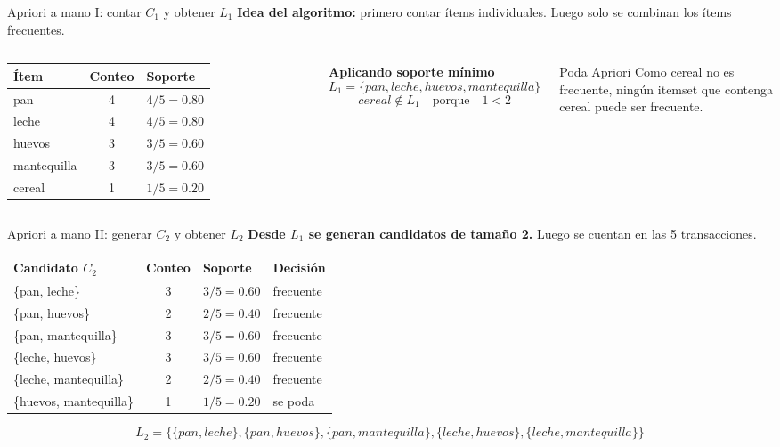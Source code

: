 \documentclass[10pt,aspectratio=169]{beamer}
\begin{document}
\begin{frame}{Apriori a mano I: contar $C_1$ y obtener $L_1$}
\scriptsize
\textbf{Idea del algoritmo:} primero contar ítems individuales. Luego solo se combinan los ítems frecuentes.

\vspace{0.15cm}
\begin{columns}[T]
\begin{table}
\centering
\begin{tabular}{lcl}
\toprule
Ítem & Conteo & Soporte \\
\midrule
pan & 4 & $4/5=0.80$ \\
leche & 4 & $4/5=0.80$ \\
huevos & 3 & $3/5=0.60$ \\
mantequilla & 3 & $3/5=0.60$ \\
cereal & 1 & $1/5=0.20$ \\
\bottomrule
\end{tabular}
\end{table}

\textbf{Aplicando soporte mínimo}
\[
L_1=\{pan, leche, huevos, mantequilla\}
\]
\[
cereal \notin L_1 \quad \text{porque} \quad 1 < 2
\]
\begin{alertblock}{Poda Apriori}
Como cereal no es frecuente, ningún itemset que contenga cereal puede ser frecuente.
\end{alertblock}
\end{columns}
\end{frame}

\begin{frame}{Apriori a mano II: generar $C_2$ y obtener $L_2$}
\scriptsize
\textbf{Desde $L_1$ se generan candidatos de tamaño 2.} Luego se cuentan en las 5 transacciones.

\begin{table}
\centering
\begin{tabular}{lcll}
\toprule
Candidato $C_2$ & Conteo & Soporte & Decisión \\
\midrule
\{pan, leche\} & 3 & $3/5=0.60$ & frecuente \\
\{pan, huevos\} & 2 & $2/5=0.40$ & frecuente \\
\{pan, mantequilla\} & 3 & $3/5=0.60$ & frecuente \\
\{leche, huevos\} & 3 & $3/5=0.60$ & frecuente \\
\{leche, mantequilla\} & 2 & $2/5=0.40$ & frecuente \\
\{huevos, mantequilla\} & 1 & $1/5=0.20$ & se poda \\
\bottomrule
\end{tabular}
\end{table}

\[
L_2=\{\{pan,leche\},\{pan,huevos\},\{pan,mantequilla\},\{leche,huevos\},\{leche,mantequilla\}\}
\]
\end{frame}
\end{document}
